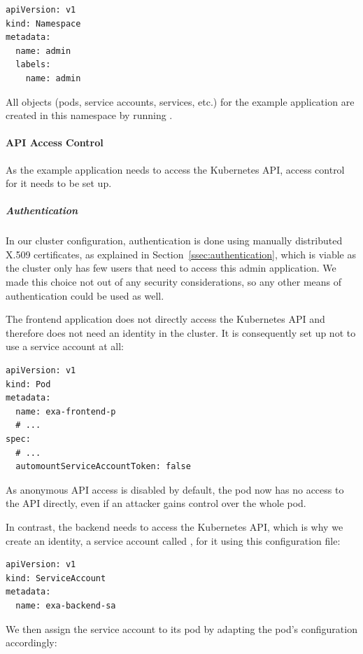 \begin{verbatim}
apiVersion: v1
kind: Namespace
metadata:
  name: admin
  labels:
    name: admin
\end{verbatim}

All objects (pods, service accounts, services, etc.) for the example application are created in this namespace by running .

\paragraph{API Access Control}

As the example application needs to access the Kubernetes API, access control for it needs to be set up.

\subparagraph{Authentication}
In our cluster configuration, authentication is done using manually distributed X.509 certificates, as explained in Section~\ref{ssec:authentication}, which is viable as the cluster only has few users that need to access this admin application. We made this choice not out of any security considerations, so any other means of authentication could be used as well. 

The frontend application does not directly access the Kubernetes API and therefore does not need an identity in the cluster. It is consequently set up not to use a service account at all:

\begin{verbatim}
apiVersion: v1
kind: Pod
metadata:
  name: exa-frontend-p
  # ...
spec:
  # ...
  automountServiceAccountToken: false
\end{verbatim}

As anonymous API access is disabled by default, the pod  now has no access to the API directly, even if an attacker gains control over the whole pod.

In contrast, the backend needs to access the Kubernetes API, which is why we create an identity, a service account called , for it using this configuration file:

\begin{verbatim}
apiVersion: v1
kind: ServiceAccount
metadata:
  name: exa-backend-sa
\end{verbatim}

We then assign the service account to its pod by adapting the pod's configuration accordingly:

